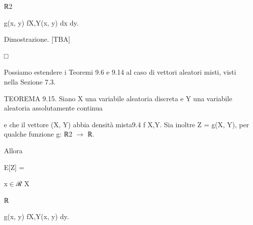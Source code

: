 \documentclass[a4paper,portrait,12pt]{article}
\begin{document}
\begin{flushleft}
ℝ2
\end{flushleft}





\begin{flushleft}
g(x, y) fX,Y(x, y) dx dy.
\end{flushleft}





\begin{flushleft}
Dimostrazione. [TBA]
\end{flushleft}





□





\begin{flushleft}
Possiamo estendere i Teoremi 9.6 e 9.14 al caso di vettori aleatori misti, visti nella Sezione 7.3.
\end{flushleft}


\begin{flushleft}
TEOREMA 9.15. Siano X una variabile aleatoria discreta e Y una variabile aleatoria assolutamente continua
\end{flushleft}


\begin{flushleft}
e che il vettore (X, Y) abbia densit\`{a} mista9.4 f X,Y. Sia inoltre Z = g(X, Y), per qualche funzione g: ℝ2 $\rightarrow$ ℝ.
\end{flushleft}


\begin{flushleft}
Allora
\end{flushleft}


\begin{flushleft}
E[Z] =
\end{flushleft}


\begin{flushleft}
x$\in$ℛ X
\end{flushleft}





\begin{flushleft}
ℝ
\end{flushleft}





\begin{flushleft}
g(x, y) fX,Y(x, y) dy.
\end{flushleft}
\end{document}
